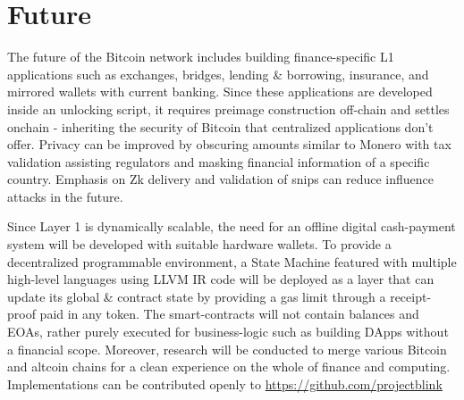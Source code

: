 \documentclass[../Bitcoin Blink.tex]{subfiles}
\begin{document}
\section{Future}

The future of the Bitcoin network includes building finance-specific L1 applications such as exchanges, bridges, lending \& borrowing, insurance, and mirrored wallets with current banking. Since these applications are developed inside an unlocking script, it requires preimage construction off-chain and settles onchain - inheriting the security of Bitcoin that centralized applications don't offer. Privacy can be improved by obscuring amounts similar to Monero with tax validation assisting regulators and masking financial information of a specific country. Emphasis on Zk delivery and validation of snips can reduce influence attacks in the future. 

Since Layer 1 is dynamically scalable, the need for an offline digital cash-payment system will be developed with suitable hardware wallets. To provide a decentralized programmable environment, a State Machine \cite{wood2014ethereum} featured with multiple high-level languages using LLVM \cite{llvm} IR code will be deployed as a layer that can update its global \& contract state by providing a gas limit through a receipt-proof paid in any token. The smart-contracts will not contain balances and EOAs, rather purely executed for business-logic such as building DApps without a financial scope. Moreover, research will be conducted to merge various Bitcoin and altcoin chains for a clean experience on the whole of finance and computing.\\

\noindent Implementations can be contributed openly to \url{https://github.com/projectblink}
\end{document}
